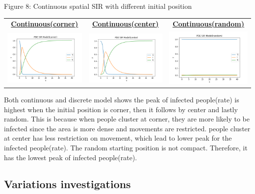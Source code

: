 \documentclass[11pt,a4paper]{article}
\begin{document}
  \begin{center}
 	Figure 8: Continuous spatial SIR with different initial position 
 \end{center}
 \begin{center}
 	
 	\begin{tabular}{c c c}
 		\textbf{\underline{Continuous(corner)}} &
 		\textbf{\underline{Continuous(center)}} &
 		\textbf{\underline{Continuous(random)}} \\
 		\includegraphics[width=.33\textwidth]{PDE(corner)_s.png} & \includegraphics[width=.33\textwidth]{PDE(center)_s.png}& \includegraphics[width=.33\textwidth]{PDE(random)_s.png}
 	\end{tabular}
 
 \end{center}

\medskip \noindent
Both continuous and discrete model shows the peak of infected people(rate) is highest when the initial position is corner, then it follows by center and lastly random. This is because when people cluster at corner, they are more likely to be infected since the area is more dense and movements are restricted. people cluster at center has less restriction on movement, which lead to lower peak for the infected people(rate). The random starting position is not compact. Therefore, it has the lowest peak of infected people(rate). 

\subsection*{Variations investigations}
\end{document}
